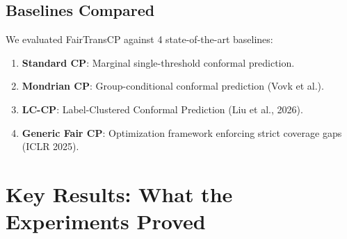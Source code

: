 \documentclass[11pt,a4paper]{article}
\begin{document}
\subsection{Baselines Compared}
We evaluated FairTransCP against 4 state-of-the-art baselines:
\begin{enumerate}[leftmargin=1.5em]
    \item \textbf{Standard CP}: Marginal single-threshold conformal prediction.
    \item \textbf{Mondrian CP}: Group-conditional conformal prediction (Vovk et al.).
    \item \textbf{LC-CP}: Label-Clustered Conformal Prediction (Liu et al., 2026).
    \item \textbf{Generic Fair CP}: Optimization framework enforcing strict coverage gaps (ICLR 2025).
\end{enumerate}

\section{Key Results: What the Experiments Proved}
\end{document}
